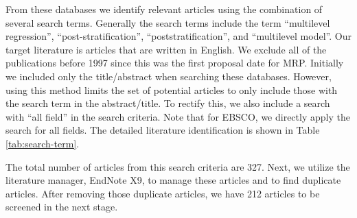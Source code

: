 \documentclass{monashthesis}
\begin{document}
From these databases we identify relevant articles using the combination of several search terms. Generally the search terms include the term ``multilevel regression'', ``post-stratification'', ``poststratification'', and ``multilevel model''. Our target literature is articles that are written in English. We exclude all of the publications before 1997 since this was the first proposal date for MRP. Initially we included only the title/abstract when searching these databases. However, using this method limits the set of potential articles to only include those with the search term in the abstract/title. To rectify this, we also include a search with ``all field'' in the search criteria. Note that for EBSCO, we directly apply the search for all fields. The detailed literature identification is shown in Table \ref{tab:search-term}.

The total number of articles from this search criteria are 327. Next, we utilize the literature manager, EndNote X9, to manage these articles and to find duplicate articles. After removing those duplicate articles, we have 212 articles to be screened in the next stage.
\end{document}
